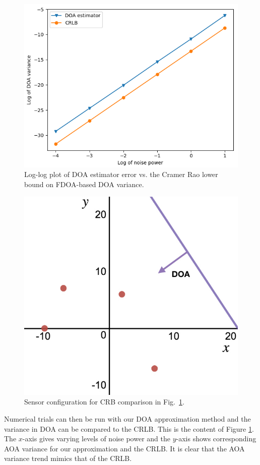 \begin{figure}
  \includegraphics[scale=0.8]{CRLBcompare}
  \caption{Log-log plot of DOA estimator error vs. the Cramer Rao lower bound on FDOA-based DOA variance. }
  \label{CRLB}
\end{figure}

\begin{figure}
  \includegraphics[scale=0.3]{sensor_config_arrow}
  \caption{Sensor configuration for CRB comparison in Fig.~\ref{CRLB}.}
  \label{config}
\end{figure}

Numerical trials can then be run with our DOA approximation method and the variance in DOA can be compared to the CRLB. This is the content of Figure \ref{CRLB}. The $x$-axis gives varying levels of noise power and the $y$-axis shows corresponding AOA variance for our approximation and the CRLB. It is clear that the AOA variance trend mimics that of the CRLB.
